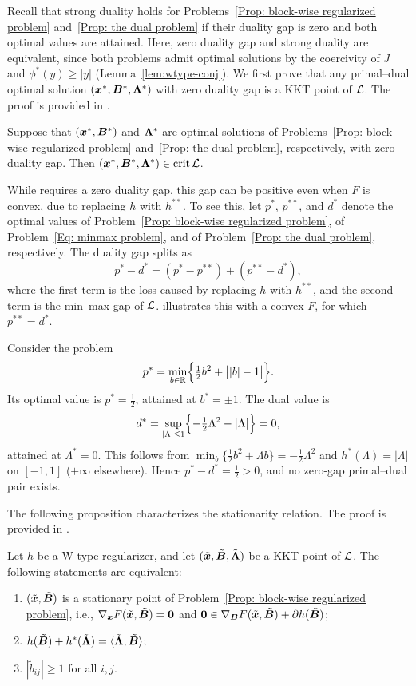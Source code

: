 Recall that strong duality holds for Problems~\eqref{Prop: block-wise regularized problem} and~\eqref{Prop: the dual problem} if their duality gap is zero and both optimal values are attained. Here, zero duality gap and strong duality are equivalent, since both problems admit optimal solutions by the coercivity of $J$ and $\phi^*(y)\ge|y|$ (Lemma~\ref{lem:wtype-conj}).
We first prove that any primal--dual optimal solution $(\bm{x}^*,\bm{B}^*,\bm{\Lambda}^*)$ with zero duality gap is a KKT point of $\mathcal{L}$. The proof is provided in .
\begin{proposition}\label{prop:zerogap}
Suppose that $(\bm{x}^*,\bm{B}^*)$ and $\bm{\Lambda}^*$ are optimal solutions of Problems~\eqref{Prop: block-wise regularized problem} and~\eqref{Prop: the dual problem}, respectively, with zero duality gap. Then $(\bm{x}^*,\bm{B}^*,\bm{\Lambda}^*)\in\operatorname{crit}\mathcal{L}$.
\end{proposition}
While  requires a zero duality gap, this gap can be positive even when $F$ is convex, due to replacing $h$ with $h^{**}$. To see this, let $p^*$, $p^{**}$, and $d^*$ denote the optimal values of Problem~\eqref{Prop: block-wise regularized problem}, of Problem~\eqref{Eq: minmax problem}, and of Problem~\eqref{Prop: the dual problem}, respectively. The duality gap splits as
\[
p^*-d^*=(p^*-p^{**})+(p^{**}-d^*),
\]
where the first term is the loss caused by replacing $h$ with $h^{**}$, and the second term is the min--max gap of $\mathcal{L}$.  illustrates this with a convex $F$, for which $p^{**}=d^*$.
\begin{example}\label{ex:gap}
Consider the problem
\[
p^*=\min_{b\in\mathbb{R}}\Bigl\{\tfrac12 b^2+\bigl||b|-1\bigr|\Bigr\}.
\]
Its optimal value is $p^*=\tfrac12$, attained at $b^*=\pm1$.
The dual value is
\[
d^*=\sup_{|\Lambda|\le1}\Bigl\{-\tfrac12\Lambda^2-|\Lambda|\Bigr\}=0,
\]
attained at $\Lambda^*=0$. This follows from $\min_b\{\tfrac12 b^2+\Lambda b\}=-\tfrac12\Lambda^2$ and $h^*(\Lambda)=|\Lambda|$ on $[-1,1]$ ($+\infty$ elsewhere).
Hence $p^*-d^*=\tfrac12>0$, and no zero-gap primal--dual pair exists.
\end{example}

The following proposition characterizes the stationarity relation. The proof is provided in .
\begin{proposition}\label{prop:transfer}
Let \(h\) be a W-type regularizer, and let $(\tilde{\bm{x}},\tilde{\bm{B}},\tilde{\bm{\Lambda}})$ be a KKT point of $\mathcal{L}$. The following statements are equivalent:
\begin{enumerate}[label=\textup{(\alph*)}]
\item $(\tilde{\bm{x}},\tilde{\bm{B}})$ is a stationary point of Problem~\eqref{Prop: block-wise regularized problem}, i.e.,
$\nabla_{\bm{x}}F(\tilde{\bm{x}},\tilde{\bm{B}})=\bm{0}$ and
$\bm{0}\in\nabla_{\bm{B}}F(\tilde{\bm{x}},\tilde{\bm{B}})+\partial h(\tilde{\bm{B}})$;
\item $h(\tilde{\bm{B}})+h^*(\tilde{\bm{\Lambda}})=\langle\tilde{\bm{\Lambda}},\tilde{\bm{B}}\rangle$;
\item $|\tilde{b}_{ij}|\ge1$ for all $i,j$.
\end{enumerate}
\end{proposition}
\endgroup

